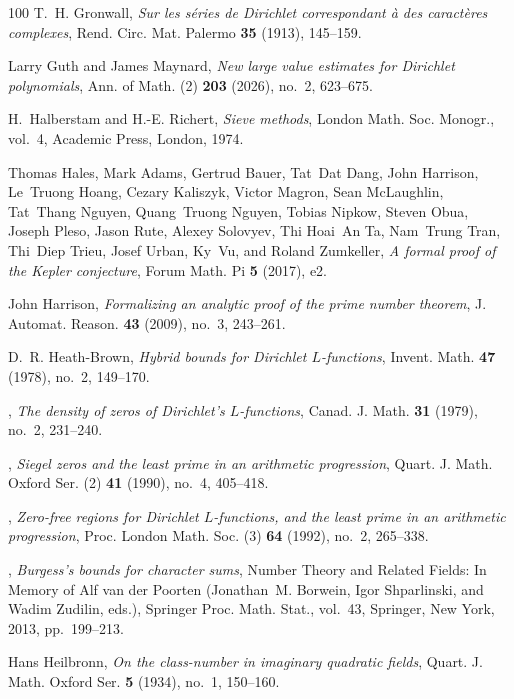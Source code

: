 \documentclass[11pt]{amsart}
\numberwithin{equation}{section}
\theoremstyle{plain}
\theoremstyle{definition}
\theoremstyle{remark}
\newcommand{\1}{\mathbf{1}}
\begin{document}
\begin{thebibliography}{100}
T.~H. Gronwall, \emph{Sur les s{\'e}ries de {D}irichlet correspondant {\`a} des
  caract{\`e}res complexes}, Rend. Circ. Mat. Palermo \textbf{35} (1913),
  145--159.

Larry Guth and James Maynard, \emph{New large value estimates for {D}irichlet
  polynomials}, Ann. of Math. (2) \textbf{203} (2026), no.~2, 623--675.

H.~Halberstam and H.-E. Richert, \emph{Sieve methods}, London Math. Soc.
  Monogr., vol.~4, Academic Press, London, 1974.

Thomas Hales, Mark Adams, Gertrud Bauer, Tat~Dat Dang, John Harrison, Le~Truong
  Hoang, Cezary Kaliszyk, Victor Magron, Sean McLaughlin, Tat~Thang Nguyen,
  Quang~Truong Nguyen, Tobias Nipkow, Steven Obua, Joseph Pleso, Jason Rute,
  Alexey Solovyev, Thi Hoai~An Ta, Nam~Trung Tran, Thi~Diep Trieu, Josef Urban,
  Ky~Vu, and Roland Zumkeller, \emph{A formal proof of the {K}epler
  conjecture}, Forum Math. Pi \textbf{5} (2017), e2.

John Harrison, \emph{Formalizing an analytic proof of the prime number
  theorem}, J. Automat. Reason. \textbf{43} (2009), no.~3, 243--261.

D.~R. Heath-Brown, \emph{Hybrid bounds for {D}irichlet {$L$}-functions},
  Invent. Math. \textbf{47} (1978), no.~2, 149--170.

\bysame, \emph{The density of zeros of {D}irichlet's {$L$}-functions}, Canad.
  J. Math. \textbf{31} (1979), no.~2, 231--240.

\bysame, \emph{Siegel zeros and the least prime in an arithmetic progression},
  Quart. J. Math. Oxford Ser. (2) \textbf{41} (1990), no.~4, 405--418.

\bysame, \emph{Zero-free regions for {D}irichlet {$L$}-functions, and the least
  prime in an arithmetic progression}, Proc. London Math. Soc. (3) \textbf{64}
  (1992), no.~2, 265--338.

\bysame, \emph{Burgess's bounds for character sums}, Number Theory and Related
  Fields: In Memory of Alf van der Poorten (Jonathan~M. Borwein, Igor
  Shparlinski, and Wadim Zudilin, eds.), Springer Proc. Math. Stat., vol.~43,
  Springer, New York, 2013, pp.~199--213.

Hans Heilbronn, \emph{On the class-number in imaginary quadratic fields},
  Quart. J. Math. Oxford Ser. \textbf{5} (1934), no.~1, 150--160.


\end{thebibliography}
\end{document}
